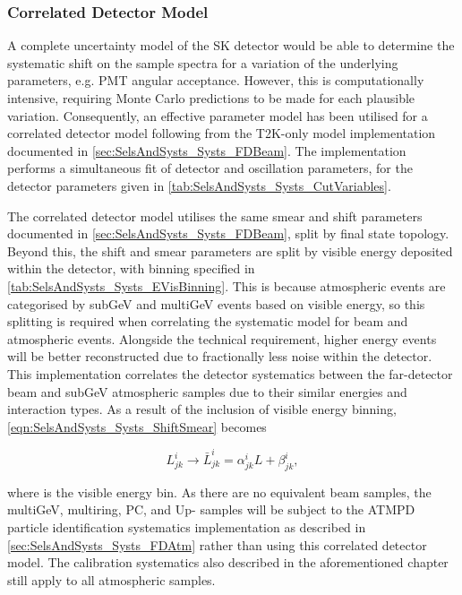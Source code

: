 \subsubsection{Correlated Detector Model}
\label{sec:SelsAndSysts_Systs_Correlated}

A complete uncertainty model of the SK detector would be able to determine the systematic shift on the sample spectra for a variation of the underlying parameters, e.g. PMT angular acceptance. However, this is computationally intensive, requiring Monte Carlo predictions to be made for each plausible variation. Consequently, an effective parameter model has been utilised for a correlated detector model following from the T2K-only model implementation documented in \autoref{sec:SelsAndSysts_Systs_FDBeam}. The implementation performs a simultaneous fit of detector and oscillation parameters, for the detector parameters given in \autoref{tab:SelsAndSysts_Systs_CutVariables}.

The correlated detector model utilises the same smear and shift parameters documented in \autoref{sec:SelsAndSysts_Systs_FDBeam}, split by final state topology. Beyond this, the shift and smear parameters are split by visible energy deposited within the detector, with binning specified in \autoref{tab:SelsAndSysts_Systs_EVisBinning}. This is because atmospheric events are categorised by subGeV and multiGeV events based on visible energy, so this splitting is required when correlating the systematic model for beam and atmospheric events. Alongside the technical requirement, higher energy events will be better reconstructed due to fractionally less noise within the detector. This implementation correlates the detector systematics between the far-detector beam and subGeV atmospheric samples due to their similar energies and interaction types. As a result of the inclusion of visible energy binning, \autoref{eqn:SelsAndSysts_Systs_ShiftSmear} becomes

\begin{equation}
  \label{eqn:SelsAndSysts_Systs_ShiftSmearWithEVis}
  L^{i}_{jk} \rightarrow \bar{L}^{i}_{jk} = \alpha^{i}_{jk} L + \beta^{i}_{jk},
\end{equation}

where  is the visible energy bin. As there are no equivalent beam samples, the multiGeV, multiring, PC, and Up-\quickmath{\mu} samples will be subject to the ATMPD particle identification systematics implementation as described in \autoref{sec:SelsAndSysts_Systs_FDAtm} rather than using this correlated detector model. The calibration systematics also described in the aforementioned chapter still apply to all atmospheric samples.

